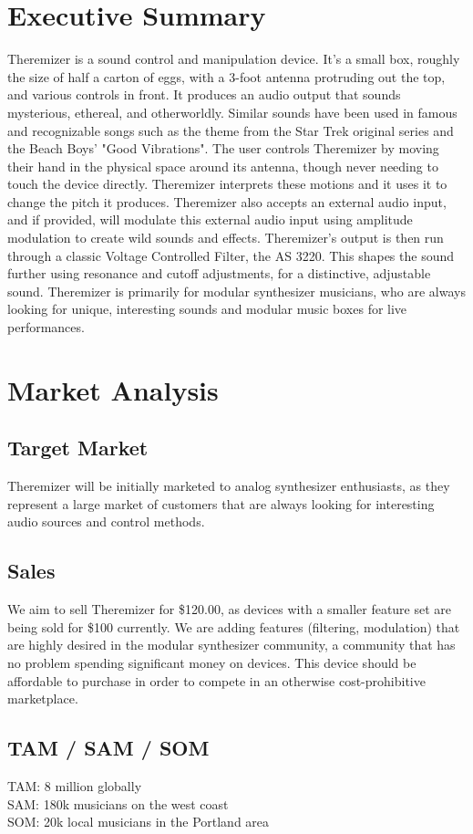 \documentclass[a4paper,12pt]{article}
\begin{document}
	\section{Executive Summary}
	Theremizer is a sound control and manipulation device. It's a small box, roughly the size of half a carton of eggs, with a 3-foot antenna protruding out the top, and various controls in front. It produces an audio output that sounds mysterious, ethereal, and otherworldly. Similar sounds have been used in famous and recognizable songs such as the theme from the Star Trek original series and the Beach Boys' "Good Vibrations". The user controls Theremizer by moving their hand in the physical space around its antenna, though never needing to touch the device directly. Theremizer interprets these motions and it uses it to change the pitch it produces. Theremizer also accepts an external audio input, and if provided, will modulate this external audio input using amplitude modulation to create wild sounds and effects. Theremizer's output is then run through a classic Voltage Controlled Filter, the AS 3220. This shapes the sound further using resonance and cutoff adjustments, for a distinctive, adjustable sound. Theremizer is primarily for modular synthesizer musicians, who are always looking for unique, interesting sounds and modular music boxes for live performances.
	\section{Market Analysis}
	\subsection{Target Market}
	Theremizer will be initially marketed to analog synthesizer enthusiasts, as they represent a large market of customers that are always looking for interesting audio sources and control methods. 

	\subsection{Sales}
	We aim to sell Theremizer for \$120.00, as devices with a smaller feature set are being sold for \$100 currently. We are adding features (filtering, modulation) that are highly desired in the modular synthesizer community, a community that has no problem spending significant money on devices. This device should be affordable to purchase in order to compete in an otherwise cost-prohibitive marketplace.
	\subsection{TAM / SAM / SOM}
	TAM: 8 million globally \\
	SAM: 180k musicians on the west coast \\ 
	SOM: 20k local musicians in the Portland area \\
	
\end{document}
